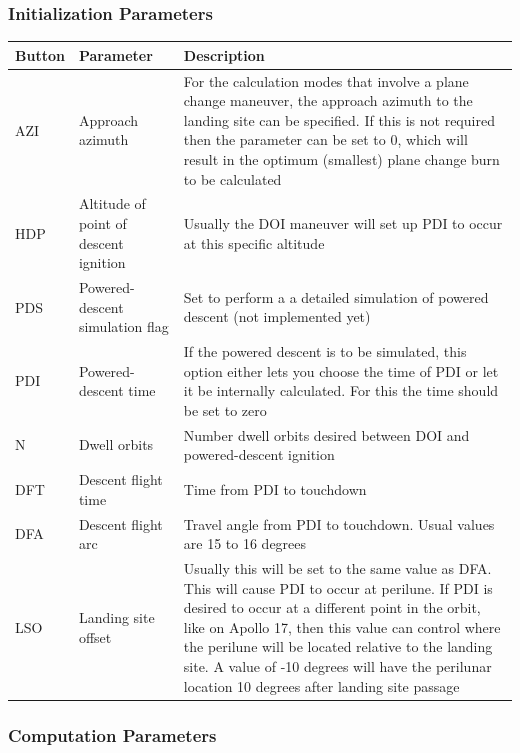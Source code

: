\documentclass[11pt]{article} %
\begin{document}
\subsubsection{Initialization Parameters}
\begin{center}
\begin{tabular}{ | m{1cm} | m{4cm} | m{8.5cm} |}
\hline
Button&Parameter&Description\\
\hline
AZI&Approach azimuth&For the calculation modes that involve a plane change maneuver, the approach azimuth to the landing site can be specified. If this is not required then the parameter can be set to 0, which will result in the optimum (smallest) plane change burn to be calculated\\
\hline
HDP&Altitude of point of descent ignition&Usually the DOI maneuver will set up PDI to occur at this specific altitude\\
\hline
PDS&Powered-descent simulation flag&Set to perform a a detailed simulation of powered descent (not implemented yet)\\
\hline
PDI&Powered-descent time&If the powered descent is to be simulated, this option either lets you choose the time of PDI or let it be internally calculated. For this the time should be set to zero\\
\hline
N&Dwell orbits&Number dwell orbits desired between DOI and powered-descent ignition\\
\hline
DFT&Descent flight time&Time from PDI to touchdown\\
\hline
DFA&Descent flight arc&Travel angle from PDI to touchdown. Usual values are 15 to 16 degrees\\
\hline
LSO&Landing site offset&Usually this will be set to the same value as DFA. This will cause PDI to occur at perilune. If PDI is desired to occur at a different point in the orbit, like on Apollo 17, then this value can control where the perilune will be located relative to the landing site. A value of -10 degrees will have the perilunar location 10 degrees after landing site passage\\
\hline
\end{tabular}
\end{center}
\newpage
\subsubsection{Computation Parameters}
\end{document}
